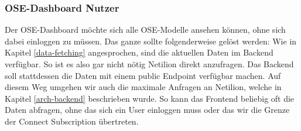 \subsubsection{OSE-Dashboard Nutzer}
Der OSE-Dashboard möchte sich alle OSE-Modelle ansehen können, ohne sich dabei einloggen zu müssen.
Das ganze sollte folgenderweise gelöst werden:
\newline
Wie in Kapitel \ref{data-fetching} angesprochen, sind die aktuellen Daten im Backend verfügbar. So ist es also gar nicht nötig Netilion direkt anzufragen. Das Backend soll stattdessen die Daten mit einem public Endpoint verfügbar machen. Auf diesem Weg umgehen wir auch die maximale Anfragen an Netilion, welche in Kapitel \ref{arch-backend} beschrieben wurde.
\newline
So kann das Frontend beliebig oft die Daten abfragen, ohne das sich ein User einloggen muss oder das wir die Grenze der Connect Subscription übertreten.